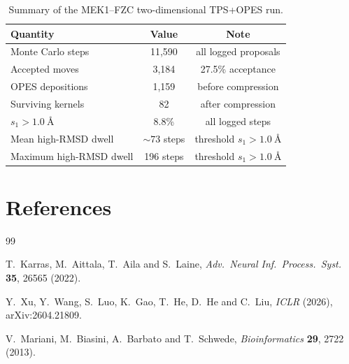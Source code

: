 \documentclass[11pt,a4paper]{article}
\begin{document}
\begin{table}[h]
\centering
\caption{Summary of the MEK1--FZC two-dimensional TPS+OPES run.}
\begin{tabular}{lcc}
\toprule
Quantity & Value & Note\\
\midrule
Monte Carlo steps & 11,590 & all logged proposals\\
Accepted moves & 3,184 & 27.5\% acceptance\\
OPES depositions & 1,159 & before compression\\
Surviving kernels & 82 & after compression\\
$s_1>1.0~\text{\AA}$ & 8.8\% & all logged steps\\
Mean high-RMSD dwell & $\sim 73$ steps & threshold $s_1>1.0~\text{\AA}$\\
Maximum high-RMSD dwell & 196 steps & threshold $s_1>1.0~\text{\AA}$\\
\bottomrule
\end{tabular}
\end{table}

\section*{References}

\begin{thebibliography}{99}

T.~Karras, M.~Aittala, T.~Aila and S.~Laine,
\textit{Adv.~Neural Inf.~Process.~Syst.} \textbf{35}, 26565 (2022).

Y.~Xu, Y.~Wang, S.~Luo, K.~Gao, T.~He, D.~He and C.~Liu,
\textit{ICLR} (2026), arXiv:2604.21809.

V.~Mariani, M.~Biasini, A.~Barbato and T.~Schwede,
\textit{Bioinformatics} \textbf{29}, 2722 (2013).

\end{thebibliography}
\end{document}

